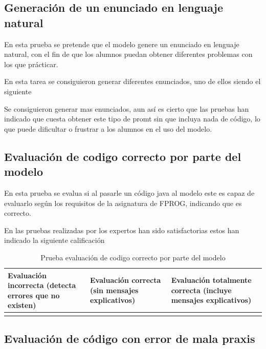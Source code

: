 \subsection{Generación de un enunciado en lenguaje natural}
\label{generacion_enunciado}
En esta prueba se pretende que el modelo genere un enunciado en lenguaje natural, con el fin de que los alumnos puedan obtener diferentes problemas con los que prácticar.

En esta tarea se consiguieron generar diferentes enunciados, uno de ellos siendo el siguiente


Se consiguieron generar mas enunciados, aun así es cierto que las pruebas han indicado que cuesta obtener este tipo de promt sin que incluya nada de código, lo que puede dificultar o frustrar a los alumnos en el uso del modelo.

\subsection{Evaluación de codigo correcto por parte del modelo}

En esta prueba se evalua si al pasarle un código java al modelo este es capaz de evaluarlo según los requisitos de la asignatura de FPROG, indicando  que es correcto.

En las pruebas realizadas por los expertos han sido satisfactorias estos han indicado la siguiente calificación

\begin{table}[htb]
    \centering
    \begin{tabular}{| >{\arraybackslash}m{}| >{\arraybackslash}m{} | >{\arraybackslash}m{}|} \hline
    \vspace{0.5em}  Evaluación incorrecta (detecta errores que no existen) \vspace{0.5em} &  Evaluación correcta (sin mensajes explicativos) & Evaluación totalmente correcta (incluye mensajes explicativos) \\ \hline
     &  & \multicolumn{1}{|c|}{X} \\ \hline 
    \end{tabular}\caption{Prueba evaluación de codigo correcto por parte del modelo}
    \label{tabla:evaluacion-ej1}
\end{table}

\subsection{Evaluación de código con error de mala praxis}

